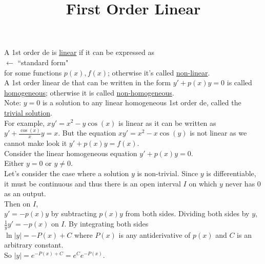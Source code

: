 \documentclass{ximera}
\begin{document}
\begin{abstract}
 \end{abstract}
    \title{First Order Linear}        
    \maketitle
 A 1st order de is \underline{linear} if it can be expressed as\\   $\leftarrow$ ``standard form"\\  for some functions $p(x),f(x)$; otherwise it's called \underline{non-linear}.\\

 A 1st order linear de that can be written in the form $y'+p(x)y=0$ is called \underline{homogeneous}; otherwise it is called \underline{non-homogeneous}.\\

 Note:  $y=0$ is a solution to any linear homogeneous 1st order de, called the \underline{trivial solution}.\\

For example, $xy'=x^2-y\cos{(x)}$ is linear as it can be written as $\displaystyle y'+\frac{\cos{(x)}}{x}y=x$.  But the equation $xy'=x^2-x\cos{(y)}$ is not linear as we cannot make look it $y'+p(x)y=f(x)$.\\

 Consider the linear homogeneous equation $y'+p(x)y=0$.  \\

 Either $y=0$ or $y\neq 0$.\\

 Let's consider the case where a solution $y$ is non-trivial.  Since $y$ is differentiable, it must be continuous and thus there is an open interval $I$ on which $y$ never has $0$ as an output. \\

Then on $I$,\\

$y'=-p(x)y$ by subtracting $p(x)y$ from both sides.  Dividing both sides by $y$, \\

 $\displaystyle \frac{1}{y} y'=-p(x)$ on $I$.  By integrating both sides\\

 $\ln{|y|}=-P(x)+C$ where $P(x)$ is any antiderivative of $p(x)$ and $C$ is an arbitrary constant.\\

 So $|y|=e^{-P(x)+C}=e^C e^{-P(x)}$.\\
\end{document}

